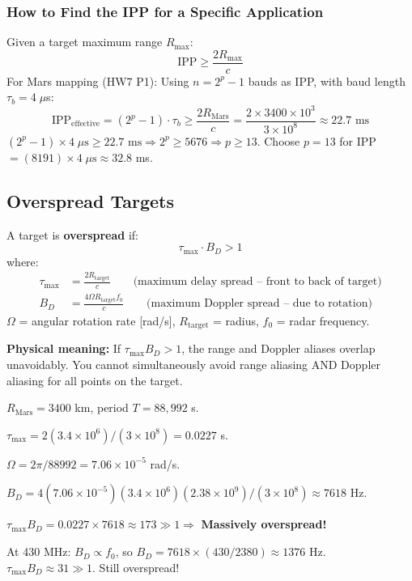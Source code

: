 \documentclass[10pt,letterpaper]{article}
\begin{document}
\subsubsection{How to Find the IPP for a Specific Application}

Given a target maximum range $R_\mathrm{max}$:
\begin{equation}
  \mathrm{IPP} \geq \frac{2R_\mathrm{max}}{c}
\end{equation}
For Mars mapping (HW7 P1): Using $n = 2^p - 1$ bauds as IPP, with baud length $\tau_b = 4\;\mu$s:
\begin{equation}
  \mathrm{IPP}_\mathrm{effective} = (2^p-1)\cdot\tau_b \geq \frac{2R_\mathrm{Mars}}{c} = \frac{2\times3400\times10^3}{3\times10^8} \approx 22.7\text{ ms}
\end{equation}
$(2^p - 1)\times4\;\mu\text{s} \geq 22.7\text{ ms} \Rightarrow 2^p \geq 5676 \Rightarrow p \geq 13$. Choose $p = 13$ for IPP $= (8191)\times4\;\mu\text{s} \approx 32.8$ ms.

\subsection{Overspread Targets}

\begin{tcolorbox}[formulabox, title={Overspread Condition}]
A target is \textbf{overspread} if:
\begin{equation}
  \tau_\mathrm{max}\cdot B_D > 1
\end{equation}
where:
\begin{align}
  \tau_\mathrm{max} &= \frac{2R_\mathrm{target}}{c} \qquad\text{(maximum delay spread -- front to back of target)} \\
  B_D &= \frac{4\Omega R_\mathrm{target} f_0}{c} \qquad\text{(maximum Doppler spread -- due to rotation)}
\end{align}
$\Omega$ = angular rotation rate [rad/s], $R_\mathrm{target}$ = radius, $f_0$ = radar frequency.
\end{tcolorbox}

\textbf{Physical meaning:} If $\tau_\mathrm{max}B_D > 1$, the range and Doppler aliases overlap unavoidably. You cannot simultaneously avoid range aliasing AND Doppler aliasing for all points on the target.

\begin{tcolorbox}[examplebox, title={HW7 P1 Example: Mars at 2.38 GHz}]
$R_\mathrm{Mars} = 3400$ km, period $T = 88{,}992$ s.

$\tau_\mathrm{max} = 2(3.4\times10^6)/(3\times10^8) = 0.0227$ s.

$\Omega = 2\pi/88992 = 7.06\times10^{-5}$ rad/s.

$B_D = 4(7.06\times10^{-5})(3.4\times10^6)(2.38\times10^9)/(3\times10^8) \approx 7618$ Hz.

$\tau_\mathrm{max}B_D = 0.0227\times7618 \approx 173 \gg 1 \Rightarrow$ \textbf{Massively overspread!}

At 430 MHz: $B_D \propto f_0$, so $B_D = 7618\times(430/2380) \approx 1376$ Hz. $\tau_\mathrm{max}B_D \approx 31 \gg 1$. Still overspread!
\end{tcolorbox}
\end{document}
